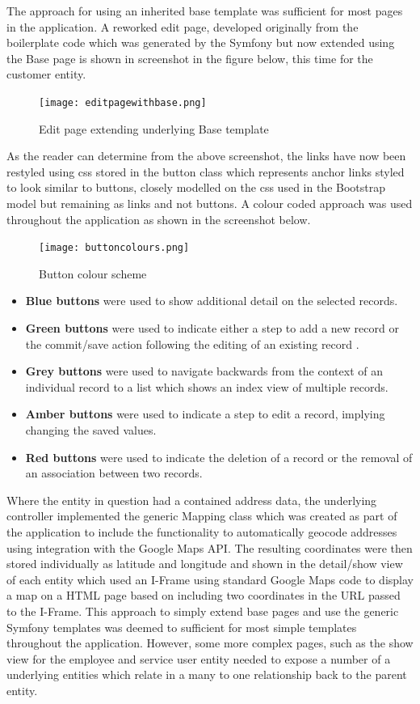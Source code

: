 \documentclass[a4paper,12pt]{article}
\begin{document}
The approach for using an inherited base template was sufficient for most pages in the application. 
A reworked edit page, developed originally from the boilerplate code which was generated by the Symfony but now extended using the Base page is shown in screenshot in the figure below, this time for the customer entity.


 \begin{figure}[h!]
\texttt{[image: editpagewithbase.png]}
  \caption{Edit page extending underlying Base template}
  \label{fig:Edit page extending underlying Base template}
\end{figure}


As the reader can determine from the above screenshot, the links have now been restyled using css stored in the button class which represents anchor links styled to look similar to buttons, closely modelled on the css used in the Bootstrap model but remaining as links and not buttons. A colour coded approach was used throughout the application as shown in the screenshot below.
 \begin{figure}[h!]
\texttt{[image: buttoncolours.png]}
  \caption{Button colour scheme}
  \label{fig:Button colour scheme}
\end{figure}
\begin {itemize}

\item \textbf{Blue buttons} were used to show additional detail on the selected records.
\item \textbf{Green buttons} were used to indicate either a step to add a new record or the commit/save action following the editing of an existing record .
\item \textbf{Grey buttons} were used to navigate backwards from the context of an individual record to a list which shows an index view of multiple records.
\item \textbf{Amber buttons} were used to indicate a step to edit a record, implying changing the saved values.
\item \textbf{Red buttons} were used to indicate the deletion of a record or the removal of an association between two records.
\end {itemize}

Where the entity in question had a contained address data, the underlying controller implemented the generic Mapping class which was created as part of the application to include the functionality to automatically geocode addresses using integration with the Google Maps API. The resulting coordinates were then stored individually as latitude and longitude and shown in the detail/show view of each entity which used an I-Frame using standard Google Maps code to display a map on a HTML page based on including two coordinates in the URL passed to the I-Frame.
This approach to simply extend base pages and use the generic Symfony templates was deemed to sufficient for most simple templates throughout the application. However, some more complex pages, such as the show view for the employee and service user entity needed to expose a number of a underlying entities which relate in a many to one relationship back to the parent entity.
\end{document}
